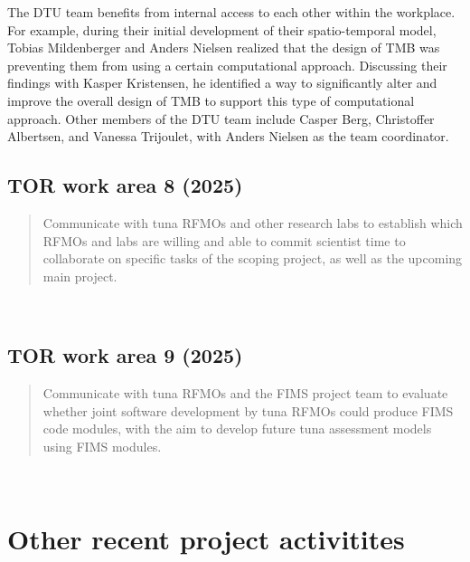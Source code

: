 \documentclass{SCreport}
\begin{document}
The DTU team benefits from internal access to each other within the workplace.
For example, during their initial development of their spatio-temporal model,
Tobias Mildenberger and Anders Nielsen realized that the design of TMB was
preventing them from using a certain computational approach. Discussing their
findings with Kasper Kristensen, he identified a way to significantly alter and
improve the overall design of TMB to support this type of computational
approach. Other members of the DTU team include Casper Berg, Christoffer
Albertsen, and Vanessa Trijoulet, with Anders Nielsen as the team coordinator.



\newpage

\subsection{TOR work area 8 (2025)}

\begin{quote}\sf
  Communicate with tuna RFMOs and other research labs to establish which RFMOs
  and labs are willing and able to commit scientist time to collaborate on
  specific tasks of the scoping project, as well as the upcoming main project.
\end{quote}

\vspace{2ex}

~

\vspace{2ex}

\subsection{TOR work area 9 (2025)}

\begin{quote}\sf
  Communicate with tuna RFMOs and the FIMS project team to evaluate whether
  joint software development by tuna RFMOs could produce FIMS code modules, with
  the aim to develop future tuna assessment models using FIMS modules.
\end{quote}

\vspace{2ex}

~

\vspace{2ex}

\section{Other recent project activitites}
\end{document}
